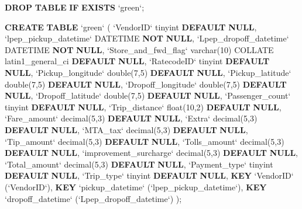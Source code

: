 \documentclass[12pt,twoside]{reedthesis}
\newenvironment{Shaded}{\begin{snugshade}}{\end{snugshade}}
\newcommand{\KeywordTok}[1]{\textcolor[rgb]{0.13,0.29,0.53}{\textbf{#1}}}
\newcommand{\DataTypeTok}[1]{\textcolor[rgb]{0.13,0.29,0.53}{#1}}
\newcommand{\DecValTok}[1]{\textcolor[rgb]{0.00,0.00,0.81}{#1}}
\newcommand{\NormalTok}[1]{#1}
\theoremstyle{definition}
\theoremstyle{definition}
\theoremstyle{definition}
\theoremstyle{remark}
\begin{document}
\begin{Shaded}
\begin{Highlighting}[]
\KeywordTok{DROP} \KeywordTok{TABLE} \KeywordTok{IF} \KeywordTok{EXISTS}\NormalTok{ `green`;}

\KeywordTok{CREATE} \KeywordTok{TABLE}\NormalTok{ `green` (}
\NormalTok{ `VendorID` tinyint }\KeywordTok{DEFAULT} \KeywordTok{NULL}\NormalTok{,}
\NormalTok{ `lpep_pickup_datetime` DATETIME }\KeywordTok{NOT} \KeywordTok{NULL}\NormalTok{,}
\NormalTok{ `Lpep_dropoff_datetime` DATETIME }\KeywordTok{NOT} \KeywordTok{NULL}\NormalTok{,}
\NormalTok{ `Store_and_fwd_flag` }\DataTypeTok{varchar}\NormalTok{(}\DecValTok{10}\NormalTok{) COLLATE latin1_general_ci }\KeywordTok{DEFAULT} \KeywordTok{NULL}\NormalTok{,}
\NormalTok{ `RatecodeID` tinyint }\KeywordTok{DEFAULT} \KeywordTok{NULL}\NormalTok{,}
\NormalTok{ `Pickup_longitude` }\DataTypeTok{double}\NormalTok{(}\DecValTok{7}\NormalTok{,}\DecValTok{5}\NormalTok{) }\KeywordTok{DEFAULT} \KeywordTok{NULL}\NormalTok{,}
\NormalTok{ `Pickup_latitude` }\DataTypeTok{double}\NormalTok{(}\DecValTok{7}\NormalTok{,}\DecValTok{5}\NormalTok{) }\KeywordTok{DEFAULT} \KeywordTok{NULL}\NormalTok{,}
\NormalTok{ `Dropoff_longitude` }\DataTypeTok{double}\NormalTok{(}\DecValTok{7}\NormalTok{,}\DecValTok{5}\NormalTok{) }\KeywordTok{DEFAULT} \KeywordTok{NULL}\NormalTok{,}
\NormalTok{ `Dropoff_latitude` }\DataTypeTok{double}\NormalTok{(}\DecValTok{7}\NormalTok{,}\DecValTok{5}\NormalTok{) }\KeywordTok{DEFAULT} \KeywordTok{NULL}\NormalTok{,}
\NormalTok{ `Passenger_count` tinyint }\KeywordTok{DEFAULT} \KeywordTok{NULL}\NormalTok{,}
\NormalTok{ `Trip_distance` }\DataTypeTok{float}\NormalTok{(}\DecValTok{10}\NormalTok{,}\DecValTok{2}\NormalTok{) }\KeywordTok{DEFAULT} \KeywordTok{NULL}\NormalTok{,}
\NormalTok{ `Fare_amount` }\DataTypeTok{decimal}\NormalTok{(}\DecValTok{5}\NormalTok{,}\DecValTok{3}\NormalTok{) }\KeywordTok{DEFAULT} \KeywordTok{NULL}\NormalTok{,}
\NormalTok{ `Extra` }\DataTypeTok{decimal}\NormalTok{(}\DecValTok{5}\NormalTok{,}\DecValTok{3}\NormalTok{) }\KeywordTok{DEFAULT} \KeywordTok{NULL}\NormalTok{,}
\NormalTok{ `MTA_tax` }\DataTypeTok{decimal}\NormalTok{(}\DecValTok{5}\NormalTok{,}\DecValTok{3}\NormalTok{) }\KeywordTok{DEFAULT} \KeywordTok{NULL}\NormalTok{,}
\NormalTok{ `Tip_amount` }\DataTypeTok{decimal}\NormalTok{(}\DecValTok{5}\NormalTok{,}\DecValTok{3}\NormalTok{) }\KeywordTok{DEFAULT} \KeywordTok{NULL}\NormalTok{,}
\NormalTok{ `Tolls_amount` }\DataTypeTok{decimal}\NormalTok{(}\DecValTok{5}\NormalTok{,}\DecValTok{3}\NormalTok{) }\KeywordTok{DEFAULT} \KeywordTok{NULL}\NormalTok{,}
\NormalTok{ `improvement_surcharge` }\DataTypeTok{decimal}\NormalTok{(}\DecValTok{5}\NormalTok{,}\DecValTok{3}\NormalTok{) }\KeywordTok{DEFAULT} \KeywordTok{NULL}\NormalTok{,}
\NormalTok{ `Total_amount` }\DataTypeTok{decimal}\NormalTok{(}\DecValTok{5}\NormalTok{,}\DecValTok{3}\NormalTok{) }\KeywordTok{DEFAULT} \KeywordTok{NULL}\NormalTok{,}
\NormalTok{ `Payment_type` tinyint }\KeywordTok{DEFAULT} \KeywordTok{NULL}\NormalTok{,}
\NormalTok{ `Trip_type` tinyint }\KeywordTok{DEFAULT} \KeywordTok{NULL}\NormalTok{,}
 \KeywordTok{KEY}\NormalTok{ `VendorID` (`VendorID`),}
 \KeywordTok{KEY}\NormalTok{ `pickup_datetime` (`lpep_pickup_datetime`),}
 \KeywordTok{KEY}\NormalTok{ `dropoff_datetime` (`Lpep_dropoff_datetime`)}
\NormalTok{);}



\end{Highlighting}
\end{Shaded}
\end{document}
